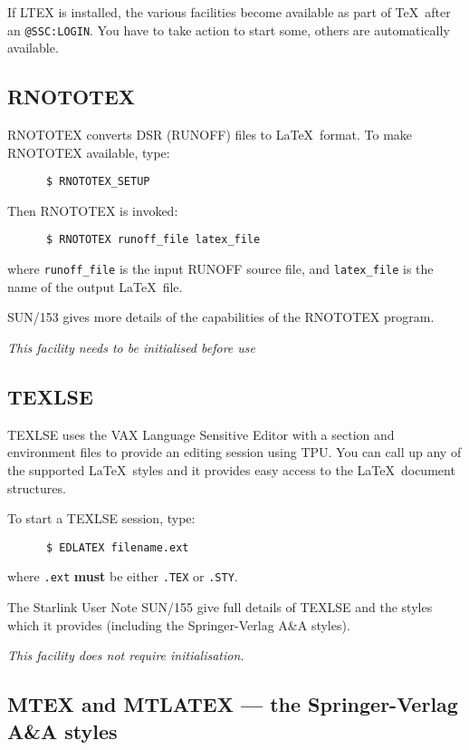 If LTEX is installed, the various facilities become available as part of \TeX\
after an {\tt @SSC:LOGIN}. You have to take action to start some, others are 
automatically available. 

\subsection{RNOTOTEX}
\label{se:rtt}

RNOTOTEX converts DSR (RUNOFF) files to \LaTeX\ format. To make RNOTOTEX
available, type:

\begin{verbatim}
      $ RNOTOTEX_SETUP
\end{verbatim}

Then RNOTOTEX is invoked:

\begin{verbatim}
      $ RNOTOTEX runoff_file latex_file
\end{verbatim}

where {\tt runoff\_file} is the input RUNOFF source file, and {\tt latex\_file}
is the name of the output \LaTeX\ file. 

SUN/153 gives more details of the capabilities of the RNOTOTEX program.

{\em This facility needs to be initialised before use}

\subsection{TEXLSE}
\label{se:tlse}

TEXLSE uses the VAX Language Sensitive Editor with a section and environment
files to provide an editing session using TPU. You can call up any of the
supported \LaTeX\ styles and it provides easy access to the \LaTeX\ document
structures. 

To start a TEXLSE session, type:

\begin{verbatim}
      $ EDLATEX filename.ext
\end{verbatim}

where \verb+.ext+ {\bf must} be either {\tt .TEX} or {\tt .STY}.

The Starlink User Note SUN/155 give full details of TEXLSE and the styles which
it provides (including the Springer-Verlag A\&A styles).

{\em This facility does not require initialisation.}

\subsection{MTEX and MTLATEX --- the Springer-Verlag A\&A styles}
\label{se:mt}

